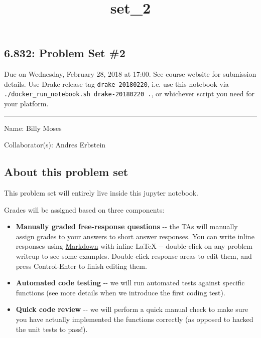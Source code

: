 \documentclass[11pt]{article}
\title{set\_2}
\providecommand{\tightlist}{%
      \setlength{\itemsep}{0pt}\setlength{\parskip}{0pt}}
\begin{document}
    
    
    \maketitle
    
    

    
    \subsection{6.832: Problem Set \#2}\label{problem-set-2}

Due on Wednesday, February 28, 2018 at 17:00. See course website for
submission details. Use Drake release tag \texttt{drake-20180220}, i.e.
use this notebook via
\texttt{./docker\_run\_notebook.sh\ drake-20180220\ .}, or whichever
script you need for your platform.

\begin{center}\rule{0.5\linewidth}{\linethickness}\end{center}

    Name: Billy Moses

Collaborator(s): Andres Erbstein

    \subsection{About this problem set}\label{about-this-problem-set}

This problem set will entirely live inside this jupyter notebook.

Grades will be assigned based on three components:

\begin{itemize}
\tightlist
\item
  \textbf{Manually graded free-response questions} -\/- the TAs will
  manually assign grades to your answers to short answer responses. You
  can write inline responses using
  \href{https://github.com/adam-p/markdown-here/wiki/Markdown-Cheatsheet}{Markdown}
  with inline LaTeX -\/- double-click on any problem writeup to see some
  examples. Double-click response areas to edit them, and press
  Control-Enter to finish editing them.
\item
  \textbf{Automated code testing} -\/- we will run automated tests
  against specific functions (see more details when we introduce the
  first coding test).
\item
  \textbf{Quick code review} -\/- we will perform a quick manual check
  to make sure you have actually implemented the functions correctly (as
  opposed to hacked the unit tests to pass!).
\end{itemize}
\end{document}
